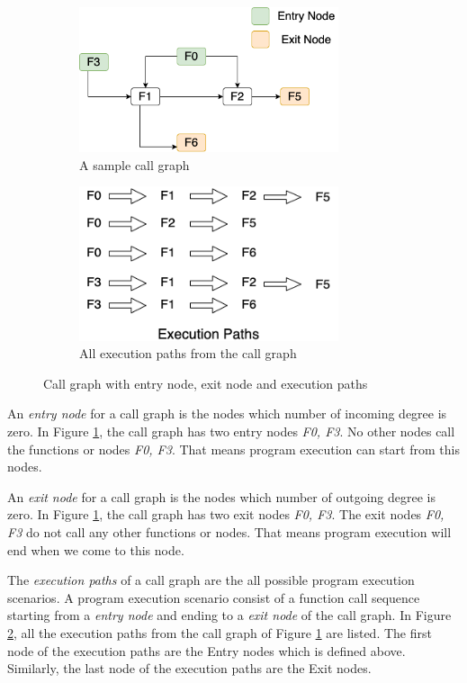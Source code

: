 \begin{figure}[h]	
	\centering
	\begin{subfigure}[h]{3in}
	\includegraphics[width=3in]{figures/background/call graph.png}
	\caption{A sample call graph}\label{fig:bg_call_graph}		
	\end{subfigure}
	\quad
	\begin{subfigure}[h]{3in}
		\includegraphics[width=3in]{figures/background/execution_paths.png}
		\caption{All execution paths from the call graph}\label{fig:bg_execution_path}
	\end{subfigure}
	\caption{Call graph with entry node, exit node and execution paths}\label{fig:1}
\end{figure}

An \emph{entry node} for a call graph is the nodes which number of incoming degree is zero. In Figure \ref{fig:bg_call_graph}, the call graph has two entry nodes \emph{F0, F3}. No other nodes call the functions or nodes \emph{F0, F3}. That means program execution can start from this nodes.

An \emph{exit node} for a call graph is the nodes which number of outgoing degree is zero. In Figure \ref{fig:bg_call_graph}, the call graph has two exit nodes \emph{F0, F3}. The exit nodes \emph{F0, F3} do not call any other functions or nodes. That means program execution will end when we come to this node.


The \emph{execution paths} of a call graph are the all possible program execution scenarios. A program execution scenario consist of a function call sequence starting from a \emph{entry node} and ending to a \emph{exit node} of the call graph. In Figure \ref{fig:bg_execution_path}, all the execution paths from the call graph of Figure \ref{fig:bg_call_graph} are listed. The first node of the execution paths are the Entry nodes which is defined above. Similarly, the last node of the execution paths are the Exit nodes. 




